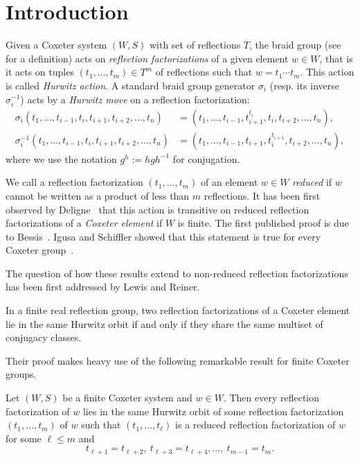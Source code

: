 \section{Introduction}\label{sec:intro}


Given a Coxeter system $(W,S)$ with set of reflections $T$, the braid group (\eg see~\cite{BDSW14} for a definition) acts on \emph{reflection factorizations} of a given element $w \in W$, that is it acts on tuples $(t_1, \ldots , t_m) \in T^m$ of reflections such that $w=t_1 \cdots t_m$. This action is called \emph{Hurwitz action}. A standard braid group generator $\sigma_i$ (resp. its inverse $\sigma_i^{-1}$) acts by a \emph{Hurwitz move} on a reflection factorization:
\begin{align*}
\sigma_i (t_1, \ldots , t_{i-1}, t_i, t_{i+1}, t_{i+2}, \ldots , t_n) & = (t_1, \ldots , t_{i-1}, t_{i+1}^{t_i}, t_{i}, t_{i+2}, \ldots , t_n),\\
\sigma_i^{-1} (t_1, \ldots , t_{i-1}, t_i, t_{i+1}, t_{i+2}, \ldots , t_n) & = (t_1, \ldots , t_{i-1}, t_{i+1}, t_{i}^{t_{i+1}}, t_{i+2}, \ldots , t_n),
\end{align*}
where we use the notation $g^h:=hgh^{-1}$ for conjugation. 

We call a reflection factorization $(t_1, \ldots , t_m)$ of an element $w \in W$ \emph{reduced} if $w$ cannot be written as a product of less than $m$ reflections. It has been first observed by Deligne~\cite{Del} that this action is transitive on reduced reflection factorizations of a \emph{Coxeter element} if $W$ is finite. The first published proof is due to Bessis~\cite[Proposition~1.6.1]{Bes03}. Igusa and Schiffler showed that this statement is true for every Coxeter group~\cite[Theorem~1.4]{IS10}. 

The question of how these results extend to non-reduced reflection factorizations has been first addressed by Lewis and Reiner.

\begin{thm*}
 In a finite real reflection group, two reflection factorizations of a Coxeter element lie in the same Hurwitz orbit if and only if they share the same multiset of conjugacy classes.
\end{thm*}

Their proof makes heavy use of the following remarkable result for finite Coxeter groups.
\begin{lemma} \label{lem:LewisR}
Let $(W,S)$ be a finite Coxeter system and $w\in W$. Then every reflection factorization of $w$ lies in the same Hurwitz orbit of some reflection factorization $(t_1, \ldots , t_m)$ of $w$ such that $(t_1, \ldots , t_{\ell})$ is a reduced reflection factorization of $w$ for some $\ell \leq m$ and 
\[
t_{\ell +1} = t_{\ell+2}, ~t_{\ell+3} = t_{\ell+4}, \ldots, ~t_{m-1}=t_m.
\]
\end{lemma}


